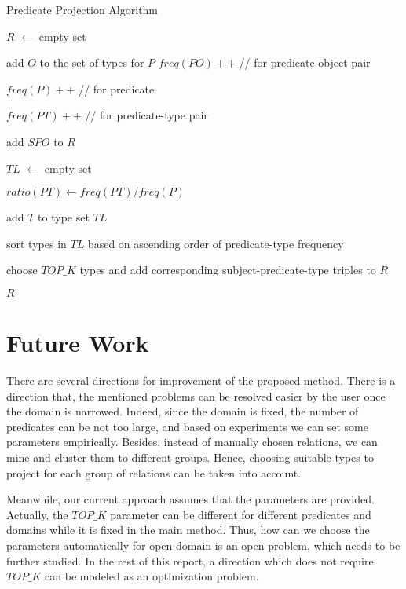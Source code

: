 \documentclass{acm_proc_article-sp}
\begin{document}
\begin{algorithm}
\label{algo1}
\caption{Predicate Projection Algorithm}

\SetAlgoLined
{}
$R$ $\leftarrow$ empty set

 {
	 {
		add $O$ to the set of types for $P$
	}
	$freq(PO)++$  //  for predicate-object pair

	$freq(P)++$  //  for predicate
}

 {
	 {
		$freq(PT)++$  //  for predicate-type pair
	}
}

 {
	 {
		add $SPO$ to $R$
	}
}
 {

	$TL$ $\leftarrow$ empty set

	 {
		$ratio(PT) \leftarrow freq(PT) / freq(P)$

		 {
			add $T$ to type set $TL$
		}
	}
	sort types in $TL$ based on ascending order of predicate-type frequency

	choose $TOP\_K$ types and add corresponding subject-predicate-type triples to $R$

}

\Return $R$

\end{algorithm}

\section{Future Work}

There are several directions for improvement of the proposed method. There is a direction that, the mentioned problems can be resolved easier by the user once the domain is narrowed. Indeed, since the domain is fixed, the number of predicates can be not too large, and based on experiments we can set some parameters empirically. Besides, instead of manually chosen relations, we can mine and cluster them to different groups. Hence, choosing suitable types to project for each group of relations can be taken into account.

Meanwhile, our current approach assumes that the parameters are provided. Actually, the $TOP\_K$ parameter can be different for different predicates and domains while it is fixed in the main method. Thus, how can we choose the parameters automatically for open domain is an open problem, which needs to be further studied. In the rest of this report, a direction which does not require $TOP\_K$ can be modeled as an optimization problem.
\end{document}
